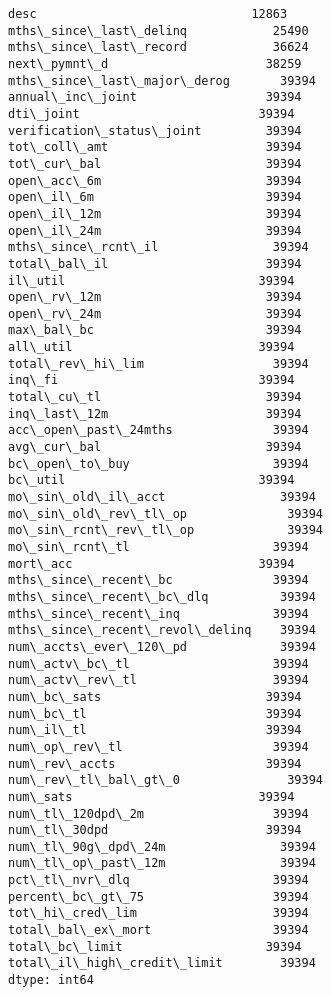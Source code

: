 \documentclass[11pt]{article}
\makeatletter
\newcommand{\boxspacing}{\kern\kvtcb@left@rule\kern\kvtcb@boxsep}
\newcommand{\prompt}[4]{
        {\ttfamily\llap{{\color{#2}[#3]:\hspace{3pt}#4}}\vspace{-\baselineskip}}
    }
\makeatother
\begin{document}
            \begin{tcolorbox}[breakable, size=fbox, boxrule=.5pt, pad at break*=1mm, opacityfill=0]
\prompt{Out}{outcolor}{43}{\boxspacing}
\begin{Verbatim}[commandchars=\\\{\}]
desc                              12863
mths\_since\_last\_delinq            25490
mths\_since\_last\_record            36624
next\_pymnt\_d                      38259
mths\_since\_last\_major\_derog       39394
annual\_inc\_joint                  39394
dti\_joint                         39394
verification\_status\_joint         39394
tot\_coll\_amt                      39394
tot\_cur\_bal                       39394
open\_acc\_6m                       39394
open\_il\_6m                        39394
open\_il\_12m                       39394
open\_il\_24m                       39394
mths\_since\_rcnt\_il                39394
total\_bal\_il                      39394
il\_util                           39394
open\_rv\_12m                       39394
open\_rv\_24m                       39394
max\_bal\_bc                        39394
all\_util                          39394
total\_rev\_hi\_lim                  39394
inq\_fi                            39394
total\_cu\_tl                       39394
inq\_last\_12m                      39394
acc\_open\_past\_24mths              39394
avg\_cur\_bal                       39394
bc\_open\_to\_buy                    39394
bc\_util                           39394
mo\_sin\_old\_il\_acct                39394
mo\_sin\_old\_rev\_tl\_op              39394
mo\_sin\_rcnt\_rev\_tl\_op             39394
mo\_sin\_rcnt\_tl                    39394
mort\_acc                          39394
mths\_since\_recent\_bc              39394
mths\_since\_recent\_bc\_dlq          39394
mths\_since\_recent\_inq             39394
mths\_since\_recent\_revol\_delinq    39394
num\_accts\_ever\_120\_pd             39394
num\_actv\_bc\_tl                    39394
num\_actv\_rev\_tl                   39394
num\_bc\_sats                       39394
num\_bc\_tl                         39394
num\_il\_tl                         39394
num\_op\_rev\_tl                     39394
num\_rev\_accts                     39394
num\_rev\_tl\_bal\_gt\_0               39394
num\_sats                          39394
num\_tl\_120dpd\_2m                  39394
num\_tl\_30dpd                      39394
num\_tl\_90g\_dpd\_24m                39394
num\_tl\_op\_past\_12m                39394
pct\_tl\_nvr\_dlq                    39394
percent\_bc\_gt\_75                  39394
tot\_hi\_cred\_lim                   39394
total\_bal\_ex\_mort                 39394
total\_bc\_limit                    39394
total\_il\_high\_credit\_limit        39394
dtype: int64
\end{Verbatim}
\end{tcolorbox}
        
\end{document}
